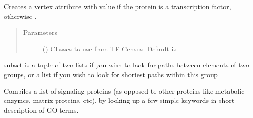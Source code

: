 \documentclass[letterpaper,10pt,english]{sphinxmanual}
\begin{document}
\begin{fulllineitems}
\begin{fulllineitems}
\label{\detokenize{main:pypath.main.PyPath.set_transcription_factors}}
Creates a vertex attribute  with value  if
the protein is a transcription factor, otherwise .
\begin{quote}\begin{description}
\item[{Parameters}] \leavevmode
{} () \textendash{} Classes to use from TF Census. Default is \sphinxtitleref{{[}‘a’, ‘b’, ‘other’{]}}.

\end{description}\end{quote}

\end{fulllineitems}


\begin{fulllineitems}
\label{\detokenize{main:pypath.main.PyPath.shortest_path_dist}}
subset is a tuple of two lists if you wish to look for
paths between elements of two groups, or a list if you
wish to look for shortest paths within this group

\end{fulllineitems}


\begin{fulllineitems}
\label{\detokenize{main:pypath.main.PyPath.signaling_proteins_list}}
Compiles a list of signaling proteins (as opposed to other
proteins like metabolic enzymes, matrix proteins, etc), by
looking up a few simple keywords in short description of GO
terms.

\end{fulllineitems}


\begin{fulllineitems}
\label{\detokenize{main:pypath.main.PyPath.signor_pathways}}
\end{fulllineitems}


\end{fulllineitems}
\end{document}
